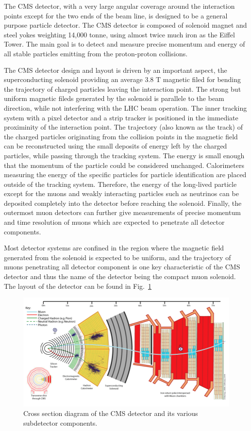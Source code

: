The CMS detector, with a very large angular coverage around the interaction points except for the two ends of the beam line, is designed to be a general purpose particle detector.
The CMS detector is composed of solenoid magnet and steel yokes weighting 14,000 tonne, using almost twice much iron as the Eiffel Tower.
The main goal is to detect and measure precise momentum and energy of all stable particles emitting from the proton-proton collisions.

The CMS detector design and layout is driven by an important aspect, the superconducting solenoid providing an average 3.8 T magnetic filed for bending the trajectory of charged particles leaving the interaction point.
The strong but uniform magnetic fileds generated by the solenoid is parallele to the beam direction, while not interfering with the LHC beam operation.
The inner tracking system with a pixel detector and a strip tracker is positioned in the immediate proximinity of the interaction point.
The trajectory (also known as the track) of the charged particles originating from the collision points in the magnetic field can be reconstructed using the small deposits of energy left by the charged particles, while passing through the tracking system.
The energy is small enough that the momentum of the particle could be considered unchanged.
Calorimeters measuring the energy of the specific particles for particle identification are placed outside of the tracking system.
Therefore, the energy of the long-lived particle except for the muons and weakly interacting particles such as neutrinos can be deposited completely into the detector before reaching the solenoid.
Finally, the outermost muon detectors can further give measurements of precise momentum and time resolution of muons which are expected to penetrate all detector components. 

Most detector systems are confined in the region where the magnetic field generated from the solenoid is expected to be uniform, and the trajectory of muons penetrating all detector component is one key characteristic of the CMS detector and thus the name of the detector being the compact muon solenoid.
The layout of the detector can be found in Fig.~\ref{fig:cms_layout}
\begin{figure}\centering
    \includegraphics[width=\textwidth]{figure/cms_layout.png}
    \caption{Cross section diagram of the CMS detector and its various subdetector components.}
    \label{fig:cms_layout}
\end{figure}

